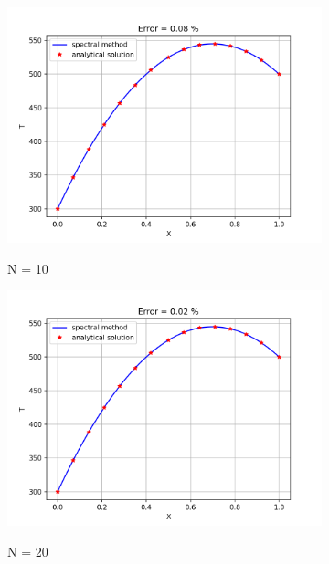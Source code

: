 \documentclass[conf]{new-aiaa}
\begin{document}
\begin{figure}[!htb]
\begin{subfigure}{0.45\textwidth}
        \includegraphics[width=\textwidth]{supportingFiles/output_N_10.png}
        \label{N_10}
        \caption{N = 10}
    \end{subfigure}
    \hfill
    \begin{subfigure}{0.45\textwidth}
        \includegraphics[width=\textwidth]{supportingFiles/output_N_20.png}
        \label{N_20}
        \caption{N = 20}
    \end{subfigure}
    \hfill
    \begin{subfigure}{0.45\textwidth}

\end{subfigure}
\end{figure}
\end{document}
